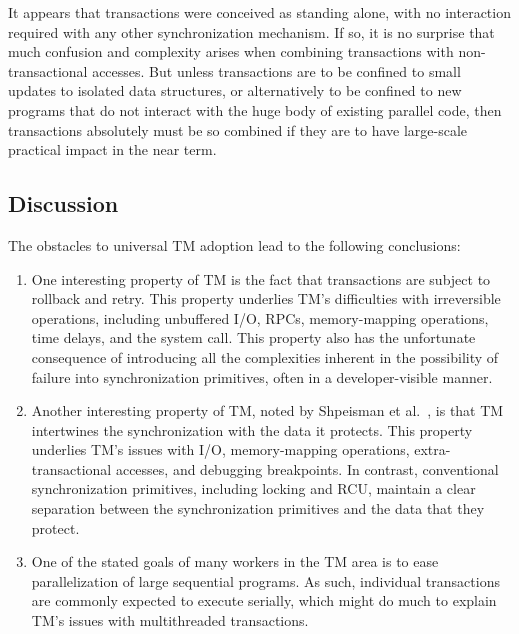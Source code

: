 It appears that transactions were conceived as standing alone, with no
interaction required with any other synchronization mechanism.
If so, it is no surprise that much confusion and complexity arises when
combining transactions with non-transactional accesses.
But unless transactions are to be confined to small updates to isolated
data structures, or alternatively to be confined to new programs
that do not interact with the huge body of existing parallel code,
then transactions absolutely must be so combined if they are to have
large-scale practical impact in the near term.


\subsection{Discussion}
\label{sec:future:Discussion}

The obstacles to universal TM adoption lead to the following
conclusions:

\begin{enumerate}
\item	One interesting property of TM is the fact that transactions are
	subject to rollback and retry.
	This property underlies TM's difficulties with irreversible
	operations, including unbuffered I/O, RPCs, memory-mapping
	operations, time delays, and the  system call.
	This property also has the unfortunate consequence of introducing
	all the complexities inherent in the possibility of
	failure into synchronization primitives, often in a developer-visible
	manner.
\item	Another interesting property of TM, noted by
	Shpeisman et al.~\cite{TatianaShpeisman2009CppTM}, is that TM
	intertwines the synchronization with the data it protects.
	This property underlies TM's issues with I/O, memory-mapping
	operations, extra-transactional accesses, and debugging
	breakpoints.
	In contrast, conventional synchronization primitives, including
	locking and RCU, maintain a clear separation between the
	synchronization primitives and the data that they protect.
\item	One of the stated goals of many workers in the TM area is to
	ease parallelization of large sequential programs.
	As such, individual transactions are commonly expected to
	execute serially, which might do much to explain TM's issues
	with multithreaded transactions.
\end{enumerate}

